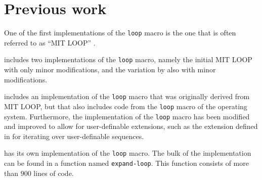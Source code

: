 \section{Previous work}

One of the first implementations of the \commonlisp{} \texttt{loop}
macro is the one that is often referred to as ``MIT LOOP''
\cite{Burke:Moon:MIT.loop}.

\ecl{} includes two implementations of the \texttt{loop} macro, namely
the initial MIT LOOP with only minor modifications, and the variation
by \symbolics{} also with minor modifications.

\sbcl{} includes an implementation of the \texttt{loop} macro that was
originally derived from MIT LOOP, but that also includes code from the
\texttt{loop} macro of the \genera{} operating system.  Furthermore,
the \sbcl{} implementation of the \texttt{loop} macro has been
modified and improved to allow for user-definable extensions, such as
the extension defined in \cite{Rhodes:2007:USC:1622123.1622138} for
iterating over user-definable sequences.

\clisp{} has its own implementation of the \texttt{loop} macro.  The
bulk of the implementation can be found in a function named
\texttt{expand-loop}.  This function consists of more than $900$ lines
of code.
